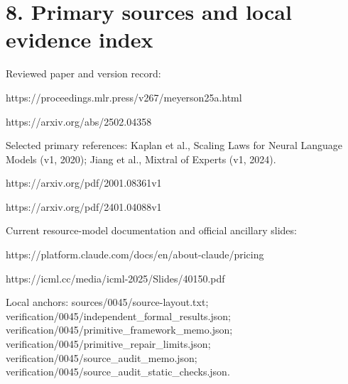 \documentclass[10pt]{article}
\begin{document}
\section*{8. Primary sources and local evidence index}
Reviewed paper and version record:\par
https://proceedings.mlr.press/v267/meyerson25a.html\par
https://arxiv.org/abs/2502.04358\par
Selected primary references: Kaplan et al., Scaling Laws for Neural Language Models (v1, 2020); Jiang et al., Mixtral of Experts (v1, 2024).\par
https://arxiv.org/pdf/2001.08361v1\par
https://arxiv.org/pdf/2401.04088v1\par
Current resource-model documentation and official ancillary slides:\par
https://platform.claude.com/docs/en/about-claude/pricing\par
https://icml.cc/media/icml-2025/Slides/40150.pdf\par
Local anchors: sources/0045/source-layout.txt; verification/0045/independent\_formal\_results.json; verification/0045/primitive\_framework\_memo.json; verification/0045/primitive\_repair\_limits.json; verification/0045/source\_audit\_memo.json; verification/0045/source\_audit\_static\_checks.json.\par
\end{document}
